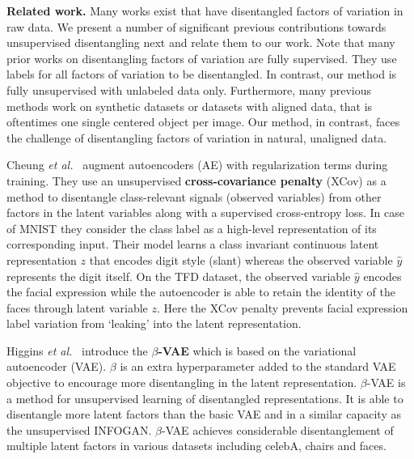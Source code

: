 \documentclass[a4paper,12pt]{report}
\begin{document}
\par \textbf{Related work.} Many works exist that have disentangled factors of variation in raw data. We present a number of significant previous contributions towards unsupervised disentangling next and relate them to our work. Note that many prior works on disentangling factors of variation are fully supervised. They use labels for all factors of variation to be disentangled. In contrast, our method is fully unsupervised with unlabeled data only. Furthermore, many previous methods work on synthetic datasets or datasets with aligned data, that is oftentimes one single centered object per image. Our method, in contrast, faces the challenge of disentangling factors of variation in natural, unaligned data.


\par Cheung \textit{et al.}~\cite{DiscHiddenFoViDN} augment autoencoders (AE) with regularization terms during training. They use an unsupervised \textbf{cross-covariance penalty} (XCov) as a method to disentangle class-relevant signals (observed variables) from other factors in the latent variables along with a supervised cross-entropy loss. In case of MNIST they consider the class label as a high-level representation of its corresponding input. Their model learns a class invariant continuous latent representation $z$ that encodes digit style (slant) whereas the observed variable $\hat{y}$ represents the digit itself. On the TFD dataset, the observed variable $\hat{y}$ encodes the facial expression while the autoencoder is able to retain the identity of the faces through latent variable $z$. Here the XCov penalty prevents facial expression label variation from ‘leaking’ into the latent representation.

\par Higgins \textit{et al.}~\cite{betaVAE} introduce the \textbf{$\beta$-VAE} which is based on the variational autoencoder (VAE). $\beta$ is an extra hyperparameter added to the standard VAE objective to encourage more disentangling in the latent representation. $\beta$-VAE is a method for unsupervised learning of disentangled representations. It is able to disentangle more latent factors than the basic VAE and in a similar capacity as the unsupervised INFOGAN. $\beta$-VAE achieves considerable disentanglement of multiple latent factors in various datasets including celebA, chairs and faces.
\end{document}
